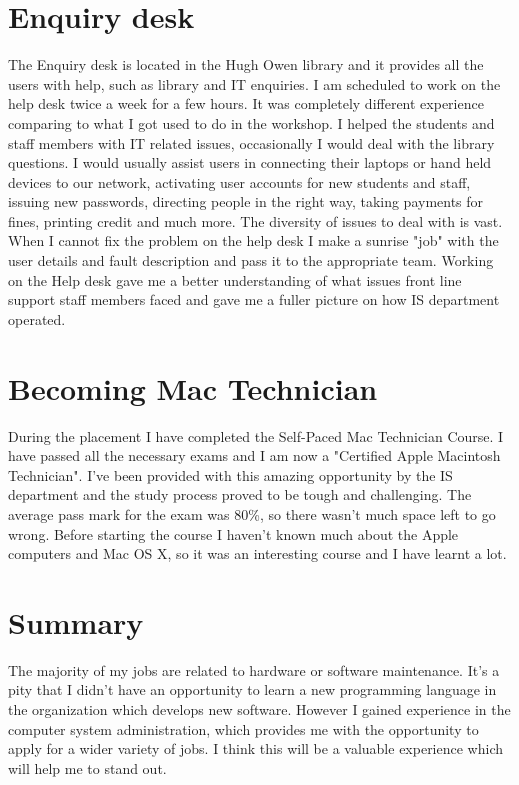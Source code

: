 \documentclass[10pt,a4paper,headinclude=true,twoside]{report}
\begin{document}
\section{Enquiry desk}
The Enquiry desk is located in the Hugh Owen library and it provides all the users with help, such as library and IT enquiries. I am scheduled to work on the help desk twice a week for a few hours. It was completely different experience comparing to what I got used to do in the workshop. I helped the students and staff members with IT related issues, occasionally I would deal with the library questions. I would usually assist users in connecting their laptops or hand held devices to our network, activating user accounts for new students and staff, issuing new passwords, directing people in the right way, taking payments for fines, printing credit and much more. The diversity of issues to deal with is vast. When I cannot fix the problem on the help desk I make a sunrise "job" with the user details and fault description and pass it to the appropriate team. Working on the Help desk gave me a better understanding of what issues front line support staff members faced and gave me a fuller picture on how IS department operated.
  
\section{Becoming Mac Technician}
During the placement I have completed the Self-Paced Mac Technician Course. I have passed all the necessary exams and I am now a "Certified Apple Macintosh Technician". I've been provided with this amazing opportunity by the IS department and the study process proved to be tough and challenging. The average pass mark for the exam was 80\%, so there wasn't much space left to go wrong. Before starting the course I haven't known much about the Apple computers and Mac OS X, so it was an interesting course and I have learnt a lot. 

\section{Summary}
The majority of my jobs are related to hardware or software maintenance. It's a pity that I didn't have an opportunity to learn a new programming language in the organization which develops new software. However I gained experience in the computer system administration, which provides me with the opportunity to apply for a wider variety of jobs. I think this will be a valuable experience which will help me to stand out.
\end{document}
